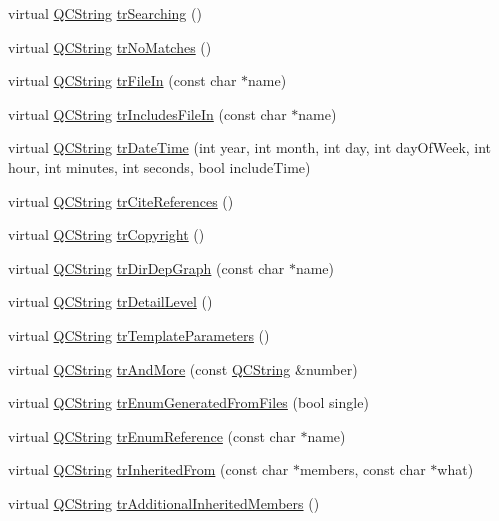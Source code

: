 \begin{DoxyCompactItemize}
\item 
virtual \hyperlink{class_q_c_string}{Q\-C\-String} \hyperlink{class_translator_croatian_aea79f5912e787bbb2c441223ccd382c6}{tr\-Searching} ()
\item 
virtual \hyperlink{class_q_c_string}{Q\-C\-String} \hyperlink{class_translator_croatian_a240e49b617153456e0f29bef561cc10f}{tr\-No\-Matches} ()
\item 
virtual \hyperlink{class_q_c_string}{Q\-C\-String} \hyperlink{class_translator_croatian_acf964d17bad4c55c393193fe9708575f}{tr\-File\-In} (const char $\ast$name)
\item 
virtual \hyperlink{class_q_c_string}{Q\-C\-String} \hyperlink{class_translator_croatian_a53f57c6e2aa0b9dc09bc47b3746d3481}{tr\-Includes\-File\-In} (const char $\ast$name)
\item 
virtual \hyperlink{class_q_c_string}{Q\-C\-String} \hyperlink{class_translator_croatian_a19c43671f677ae0445fca1fe7a5f62cc}{tr\-Date\-Time} (int year, int month, int day, int day\-Of\-Week, int hour, int minutes, int seconds, bool include\-Time)
\item 
virtual \hyperlink{class_q_c_string}{Q\-C\-String} \hyperlink{class_translator_croatian_ae43b2c6dbb1637144e32cd13a0d4704c}{tr\-Cite\-References} ()
\item 
virtual \hyperlink{class_q_c_string}{Q\-C\-String} \hyperlink{class_translator_croatian_a840474c30dfc2d4e92d1a29c5d1bf343}{tr\-Copyright} ()
\item 
virtual \hyperlink{class_q_c_string}{Q\-C\-String} \hyperlink{class_translator_croatian_abbe522be6eed72f54409458a1896323c}{tr\-Dir\-Dep\-Graph} (const char $\ast$name)
\item 
virtual \hyperlink{class_q_c_string}{Q\-C\-String} \hyperlink{class_translator_croatian_a138b581235bf64a0338ed25ee0d1ad61}{tr\-Detail\-Level} ()
\item 
virtual \hyperlink{class_q_c_string}{Q\-C\-String} \hyperlink{class_translator_croatian_ad9599164391093757c91bbe746f694a5}{tr\-Template\-Parameters} ()
\item 
virtual \hyperlink{class_q_c_string}{Q\-C\-String} \hyperlink{class_translator_croatian_a391327398836ee03f1d00415b80cb997}{tr\-And\-More} (const \hyperlink{class_q_c_string}{Q\-C\-String} \&number)
\item 
virtual \hyperlink{class_q_c_string}{Q\-C\-String} \hyperlink{class_translator_croatian_a2039b9a9624800366462f980e8ebce70}{tr\-Enum\-Generated\-From\-Files} (bool single)
\item 
virtual \hyperlink{class_q_c_string}{Q\-C\-String} \hyperlink{class_translator_croatian_a0209ef4cc7768fc9abf62f7ffc95534e}{tr\-Enum\-Reference} (const char $\ast$name)
\item 
virtual \hyperlink{class_q_c_string}{Q\-C\-String} \hyperlink{class_translator_croatian_af8b8b1bb56a7ea74b11dad76e644968e}{tr\-Inherited\-From} (const char $\ast$members, const char $\ast$what)
\item 
virtual \hyperlink{class_q_c_string}{Q\-C\-String} \hyperlink{class_translator_croatian_a62da1a83afa60109108fba6ad327a06f}{tr\-Additional\-Inherited\-Members} ()
\end{DoxyCompactItemize}

